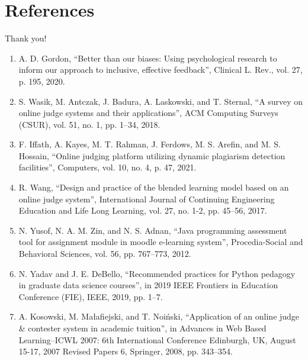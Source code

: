 \documentclass{beamer}%
\begin{document}
\section[References]{References}
\begin{frame}{ }
\begin{changemargin}
\footnotesize

\begin{minipage}[t][0.8715\textheight]{\linewidth}
\begin{center}
Thank you! \vspace{1.5ex}
\end{center}

\scriptsize
\begin{enumerate}

\item<1->[[1\text{]}] A. D. Gordon, “Better than our biases: Using psychological research to inform our approach to inclusive, effective feedback”, Clinical L. Rev., vol. 27, p. 195, 2020.
\item<1->[[2\text{]}] S. Wasik, M. Antczak, J. Badura, A. Laskowski, and T. Sternal, “A survey on online judge systems and their applications”, ACM Computing Surveys (CSUR), vol. 51, no. 1, pp. 1–34, 2018.
\item<1->[[3\text{]}] F. Iffath, A. Kayes, M. T. Rahman, J. Ferdows, M. S. Arefin, and M. S. Hossain, “Online judging platform utilizing dynamic plagiarism detection facilities”, Computers, vol. 10, no. 4, p. 47, 2021.
\item<1->[[4\text{]}] R. Wang, “Design and practice of the blended learning model based on an online judge system”, International Journal of Continuing Engineering Education and Life Long Learning, vol. 27, no. 1-2, pp. 45–56, 2017.
\item<1->[[5\text{]}] N. Yusof, N. A. M. Zin, and N. S. Adnan, “Java programming assessment tool for assignment module in moodle e-learning system”, Procedia-Social and Behavioral Sciences, vol. 56, pp. 767–773, 2012.
\item<1->[[6\text{]}] N. Yadav and J. E. DeBello, “Recommended practices for Python pedagogy in graduate data science courses”, in 2019 IEEE Frontiers in Education Conference (FIE), IEEE, 2019, pp. 1–7.
\item<1->[[7\text{]}] A. Kosowski, M. Małafiejski, and T. Noiński, “Application of an online judge & contester system in academic tuition”, in Advances in Web Based Learning–ICWL 2007: 6th International Conference Edinburgh, UK, August 15-17, 2007 Revised Papers 6, Springer, 2008, pp. 343–354.



\end{enumerate}


\vspace{3ex}%
\end{minipage}



\end{changemargin}
\end{frame}
\end{document}
